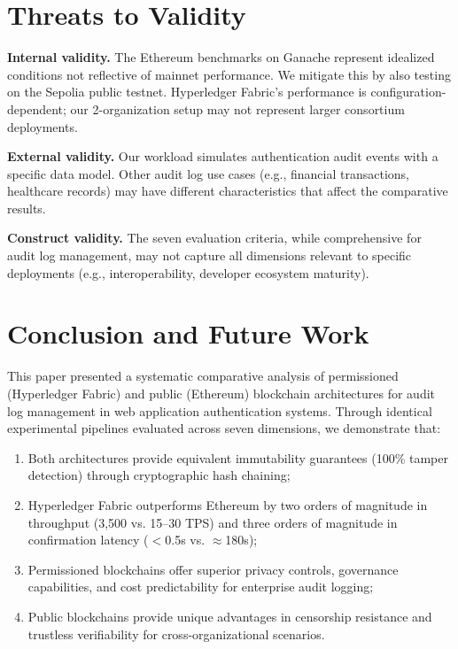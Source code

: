\documentclass[12pt,a4paper]{article}
\begin{document}
\section{Threats to Validity}
\label{sec:threats}

\textbf{Internal validity.} The Ethereum benchmarks on Ganache represent idealized conditions not reflective of mainnet performance. We mitigate this by also testing on the Sepolia public testnet. Hyperledger Fabric's performance is configuration-dependent; our 2-organization setup may not represent larger consortium deployments.

\textbf{External validity.} Our workload simulates authentication audit events with a specific data model. Other audit log use cases (e.g., financial transactions, healthcare records) may have different characteristics that affect the comparative results.

\textbf{Construct validity.} The seven evaluation criteria, while comprehensive for audit log management, may not capture all dimensions relevant to specific deployments (e.g., interoperability, developer ecosystem maturity).

\section{Conclusion and Future Work}
\label{sec:conclusion}

This paper presented a systematic comparative analysis of permissioned (Hyperledger Fabric) and public (Ethereum) blockchain architectures for audit log management in web application authentication systems. Through identical experimental pipelines evaluated across seven dimensions, we demonstrate that:

\begin{enumerate}
    \item Both architectures provide equivalent immutability guarantees (100\% tamper detection) through cryptographic hash chaining;
    \item Hyperledger Fabric outperforms Ethereum by two orders of magnitude in throughput (3,500 vs. 15--30 TPS) and three orders of magnitude in confirmation latency ($<$0.5s vs. $\approx$180s);
    \item Permissioned blockchains offer superior privacy controls, governance capabilities, and cost predictability for enterprise audit logging;
    \item Public blockchains provide unique advantages in censorship resistance and trustless verifiability for cross-organizational scenarios.
\end{enumerate}
\end{document}
